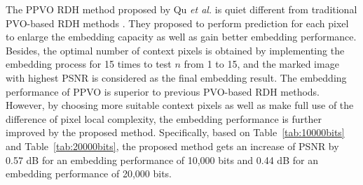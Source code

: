 \documentclass[review,3p,10pt,sort&compress]{elsarticle}
\begin{document}
The PPVO RDH method proposed by Qu \emph{et al.} \cite{Qu2015PPVO} is quiet different from traditional PVO-based RDH methods \cite{Li2013PVO,Peng2014IPVO,Ou2014PVOk}. They proposed to perform prediction for each pixel to enlarge the embedding capacity as well as gain better embedding performance. Besides, the optimal number of context pixels is obtained by implementing the embedding process for 15 times to test $n$ from 1 to 15, and the marked image with highest PSNR is considered as the final embedding result. The embedding performance of PPVO is superior to previous PVO-based RDH methods. However, by choosing more suitable context pixels as well as make full use of the difference of pixel local complexity, the embedding performance is further improved by the proposed method. Specifically, based on Table~\ref{tab:10000bits} and Table~\ref{tab:20000bits}, the proposed method gets an increase of PSNR by 0.57 dB for an embedding performance of 10,000 bits and 0.44 dB for an embedding performance of 20,000 bits.
\end{document}
